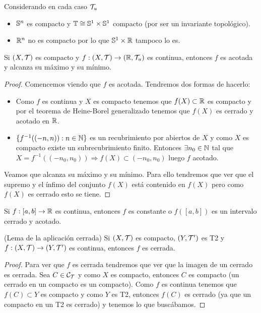 \begin{ejemplo}Considerando en cada caso $\mathcal{T}_u$
    \begin{itemize}
        \item $\mathbb{S}^n$ es compacto y $\mathbb{T}\cong \mathbb{S}^1\times \mathbb{S}^1$ compacto (por ser un invariante topológico).
        \item $\mathbb{R}^n$ no es compacto por lo que $\mathbb{S}^1\times \mathbb{R}$ tampoco lo es.
    \end{itemize}
    \endsquare
\end{ejemplo}

\begin{coro}
    Si $(X, \mathcal{T})$ es compacto y $f:(X, \mathcal{T})\to (\mathbb{R}, \mathcal{T}_u)$ es continua, entonces $f$ es acotada y alcanza su máximo y su mínimo.
    \begin{proof}
        Comencemos viendo que $f$ es acotada. Tendremos dos formas de hacerlo:

        \begin{itemize}
            \item[\textbf{1: }] Como $f$ es continua y $X$ es compacto tenemos que $f(X)\subset \mathbb{R}$ es compacto y por el teorema de Heine-Borel generalizado tenemos que $f(X)$ es cerrado y acotado en $\mathbb{R}$.
            \item[\textbf{2: }] $\{f^{-1}((-n,n)):n\in \mathbb{N}\}$ es un recubrimiento por abiertos de $X$ y como $X$ es compacto existe un subrecubrimiento finito. Entonces $\exists n_0\in \mathbb{N}$ tal que $X=f^{-1}((-n_0, n_0)) \Rightarrow f(X)\subset (-n_0, n_0)$ luego $f$ acotado.
        \end{itemize}
        
        Veamos que alcanza su máximo y su mínimo. Para ello tendremos que ver que el supremo y el ínfimo del conjunto $f(X)$ está contenido en $f(X)$ pero como $f(X)$ es cerrado esto se tiene.

    \end{proof}
\end{coro}

\begin{coro}
    Si $f:[a,b]\to \mathbb{R}$ es continua, entonces $f$ es constante o $f([a,b])$ es un intervalo cerrado y acotado.
    \endsquare
\end{coro}

\begin{prop}
    (Lema de la aplicación cerrada) Si $(X, \mathcal{T})$ es compacto, $(Y, \mathcal{T}')$ es T2 y $f:(X, \mathcal{T})\to (Y, \mathcal{T}')$ es continua, entonces $f$ es cerrada.
    \begin{proof}
        Para ver que $f$ es cerrada tendremos que ver que la imagen de un cerrado es cerrada. Sea $C\in \mathcal{C}_{\mathcal{T}}$ y como $X$ es compacto, entonces $C$ es compacto (un cerrado en un compacto es un compacto). Como $f$ es continua tenemos que $f(C)\subset Y$ es compacto y como $Y$ es T2, entonces $f(C)$ es cerrado (ya que un compacto en un T2 es cerrado) y tenemos lo que buscábamos.

    \end{proof}
\end{prop}

